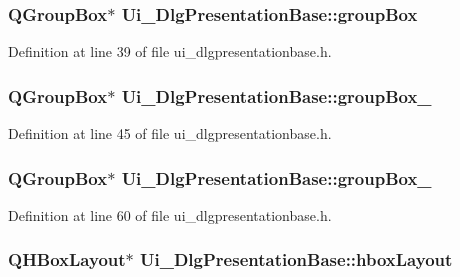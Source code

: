 \hypertarget{classUi__DlgPresentationBase_a32e91831bba9e18b1bd040f092d18f7a}{
\subsubsection[{group\+Box}]{\setlength{\rightskip}{0pt plus 5cm}Q\+Group\+Box$\ast$ Ui\+\_\+\+Dlg\+Presentation\+Base\+::group\+Box}}\label{classUi__DlgPresentationBase_a32e91831bba9e18b1bd040f092d18f7a}


Definition at line 39 of file ui\+\_\+dlgpresentationbase.\+h.

\hypertarget{classUi__DlgPresentationBase_a74ff79cdf30be7fcd1d8a52488d14bbf}{
\subsubsection[{group\+Box\+\_\+2}]{\setlength{\rightskip}{0pt plus 5cm}Q\+Group\+Box$\ast$ Ui\+\_\+\+Dlg\+Presentation\+Base\+::group\+Box\+\_}}\label{classUi__DlgPresentationBase_a74ff79cdf30be7fcd1d8a52488d14bbf}


Definition at line 45 of file ui\+\_\+dlgpresentationbase.\+h.

\hypertarget{classUi__DlgPresentationBase_a73af927030719bc78930ff5a07ceb5e5}{
\subsubsection[{group\+Box\+\_\+4}]{\setlength{\rightskip}{0pt plus 5cm}Q\+Group\+Box$\ast$ Ui\+\_\+\+Dlg\+Presentation\+Base\+::group\+Box\+\_}}\label{classUi__DlgPresentationBase_a73af927030719bc78930ff5a07ceb5e5}


Definition at line 60 of file ui\+\_\+dlgpresentationbase.\+h.

\hypertarget{classUi__DlgPresentationBase_a768dd80243404f4b784802baae0d8b12}{
\subsubsection[{hbox\+Layout}]{\setlength{\rightskip}{0pt plus 5cm}Q\+H\+Box\+Layout$\ast$ Ui\+\_\+\+Dlg\+Presentation\+Base\+::hbox\+Layout}}\label{classUi__DlgPresentationBase_a768dd80243404f4b784802baae0d8b12}


